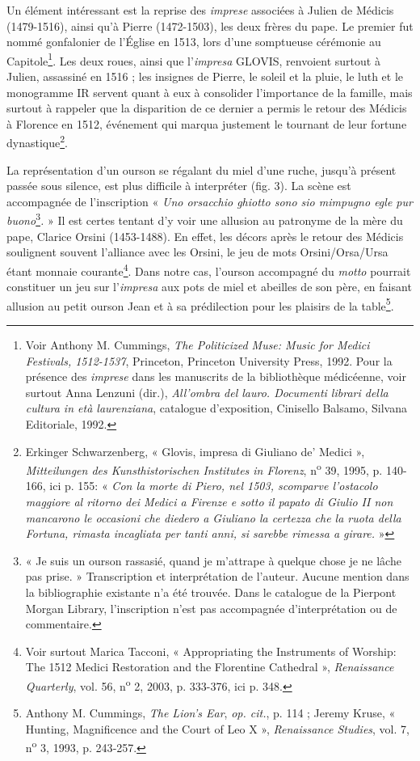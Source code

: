 \documentclass[12pt,twoside,openany]{book}
\begin{document}
Un élément intéressant est la reprise des \textit{imprese} associées à Julien de Médicis (1479-1516), ainsi qu’à Pierre (1472-1503), les deux frères du pape. Le premier fut nommé gonfalonier de l’Église en 1513, lors d’une somptueuse cérémonie au Capitole\footnote{Voir Anthony M. Cummings, \textit{The Politicized Muse: Music for Medici Festivals, 1512-1537}, Princeton, Princeton University Press, 1992. Pour la présence des \textit{imprese }dans les manuscrits de la bibliothèque médicéenne, voir surtout Anna Lenzuni (dir.), \textit{All’ombra del lauro. Documenti librari della cultura in età laurenziana}, catalogue d’exposition, Cinisello Balsamo, Silvana Editoriale, 1992.}. Les deux roues, ainsi que l’\textit{impresa} GLOVIS, renvoient surtout à Julien, assassiné en 1516 ; les insignes de Pierre, le soleil et la pluie, le luth et le monogramme IR servent quant à eux à consolider l’importance de la famille, mais surtout à rappeler que la disparition de ce dernier a permis le retour des Médicis à Florence en 1512, événement qui marqua justement le tournant de leur fortune dynastique\footnote{Erkinger Schwarzenberg, « Glovis, impresa di Giuliano de’ Medici », \textit{Mitteilungen des Kunsthistorischen Institutes in Florenz}, n\textsuperscript{o} 39, 1995, p. 140-166, ici p. 155: «\textit{ Con la morte di Piero, nel 1503, scomparve l’ostacolo maggiore al ritorno dei Medici a Firenze e sotto il papato di Giulio II non mancarono le occasioni che diedero a Giuliano la certezza che la ruota della Fortuna, rimasta incagliata per tanti anni, si sarebbe rimessa a girare.} »}.

La représentation d’un ourson se régalant du miel d’une ruche, jusqu’à présent passée sous silence, est plus difficile à interpréter (fig. 3). La scène est accompagnée de l’inscription « \textit{Uno orsacchio ghiotto sono sio mimpugno egle pur buono}\footnote{« Je suis un ourson rassasié, quand je m’attrape à quelque chose je ne lâche pas prise. » Transcription et interprétation de l’auteur. Aucune mention dans la bibliographie existante n’a été trouvée. Dans le catalogue de la Pierpont Morgan Library, l’inscription n’est pas accompagnée d’interprétation ou de commentaire.}\textit{. }» Il est certes tentant d’y voir une allusion au patronyme de la mère du pape, Clarice Orsini (1453-1488). En effet, les décors après le retour des Médicis soulignent souvent l’alliance avec les Orsini, le jeu de mots Orsini/Orsa/Ursa étant monnaie courante\footnote{Voir surtout Marica Tacconi, « Appropriating the Instruments of Worship: The 1512 Medici Restoration and the Florentine Cathedral », \textit{Renaissance Quarterly}, vol. 56, n\textsuperscript{o} 2, 2003, p. 333-376, ici p. 348.}. Dans notre cas, l’ourson accompagné du \textit{motto} pourrait constituer un jeu sur l’\textit{impresa} aux pots de miel et abeilles de son père, en faisant allusion au petit ourson Jean et à sa prédilection pour les plaisirs de la table\footnote{Anthony M. Cummings, \textit{The Lion’s Ear}, \textit{op. cit.}, p. 114 ; Jeremy Kruse, « Hunting, Magnificence and the Court of Leo X », \textit{Renaissance Studies}, vol. 7, n\textsuperscript{o} 3, 1993, p. 243‑257.}.
\end{document}
